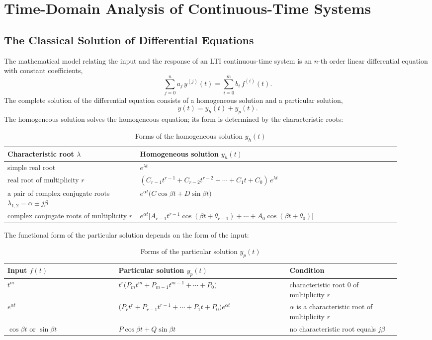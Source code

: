 \chapter{Time-Domain Analysis of Continuous-Time Systems}

\section{The Classical Solution of Differential Equations}

The mathematical model relating the input and the response of an LTI
continuous-time system is an $n$-th order linear differential equation with
constant coefficients,
\[
    \sum_{j=0}^{n}a_j\,y^{(j)}(t)=\sum_{i=0}^{m}b_i\,f^{(i)}(t).
\]
The complete solution of the differential equation consists of a homogeneous
solution and a particular solution,
\[
    y(t)=y_h(t)+y_p(t).
\]
The homogeneous solution solves the homogeneous equation; its form is
determined by the characteristic roots:

\begin{table}[htbp]
\centering
\caption{Forms of the homogeneous solution $y_h(t)$}
\small
\begin{tabular}{@{}p{0.31\linewidth}p{0.61\linewidth}@{}}
\toprule
Characteristic root $\lambda$ & Homogeneous solution $y_h(t)$ \\
\midrule
simple real root & $e^{\lambda t}$ \\
real root of multiplicity $r$ & $(C_{r-1}t^{r-1}+C_{r-2}t^{r-2}+\cdots+C_1t+C_0)\,e^{\lambda t}$ \\
a pair of complex conjugate roots $\lambda_{1,2}=\alpha\pm j\beta$ &
$e^{\alpha t}\bigl(C\cos\beta t+D\sin\beta t\bigr)$ \\
complex conjugate roots of multiplicity $r$ &
$e^{\alpha t}\bigl[A_{r-1}t^{r-1}\cos(\beta t+\theta_{r-1})+\cdots+A_0\cos(\beta t+\theta_0)\bigr]$ \\
\bottomrule
\end{tabular}
\end{table}

The functional form of the particular solution depends on the form of the
input:

\begin{table}[htbp]
\centering
\caption{Forms of the particular solution $y_p(t)$}
\small
\begin{tabular}{@{}p{0.26\linewidth}p{0.40\linewidth}p{0.26\linewidth}@{}}
\toprule
Input $f(t)$ & Particular solution $y_p(t)$ & Condition \\
\midrule
$t^{m}$ & $t^{r}\bigl(P_mt^{m}+P_{m-1}t^{m-1}+\cdots+P_0\bigr)$ &
characteristic root $0$ of multiplicity $r$ \\
$e^{\alpha t}$ & $\bigl(P_rt^{r}+P_{r-1}t^{r-1}+\cdots+P_1t+P_0\bigr)e^{\alpha t}$ &
$\alpha$ is a characteristic root of multiplicity $r$ \\
$\cos\beta t$ or $\sin\beta t$ & $P\cos\beta t+Q\sin\beta t$ &
no characteristic root equals $j\beta$ \\
\bottomrule
\end{tabular}
\end{table}

